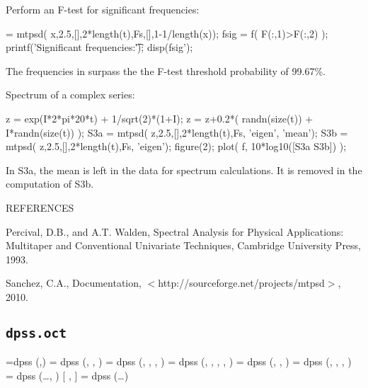 \noindent Perform an F-test for significant frequencies:
\begin{texiexample}
    [S2,f,Sc2,F] = mtpsd( x,2.5,[],2*length(t),Fs,[],1-1/length(x));
    fsig = f( F(:,1)>F(:,2) ); 
    printf('Significant frequencies:\t');
    disp(fsig');
\end{texiexample}
The frequencies in  surpass the the F-test threshold probability of 99.67\%.
\medskip

\noindent Spectrum of a complex series:
\begin{texiexample}
    z = exp(I*2*pi*20*t) + 1/sqrt(2)*(1+I);
    z = z+0.2*( randn(size(t)) + I*randn(size(t)) );
    S3a = mtpsd( z,2.5,[],2*length(t),Fs, 'eigen', 'mean');
    S3b = mtpsd( z,2.5,[],2*length(t),Fs, 'eigen');
    figure(2);
    plot( f, 10*log10([S3a S3b]) ); 
\end{texiexample}
In S3a, the mean is left in the data for spectrum calculations.  It is removed in the computation of S3b.
\bigskip

\noindent REFERENCES
\medskip

\noindent [1] Percival, D.B., and A.T. Walden, Spectral Analysis for Physical Applications: Multitaper and Conventional Univariate Techniques, Cambridge University Press, 1993.
\smallskip

\noindent [2] Sanchez, C.A.,  Documentation, $<$http://sourceforge.net/projects/mtpsd$>$, 2010.

\subsection{\texttt{dpss.oct}}

 { =}{dpss (,)}
 { =} {dpss (, , )}
 { =} {dpss (, , , )}
 { =} {dpss (, , , , )}
 { =} {dpss (, , )}
 { =} {dpss (, , , )}
 { =} {dpss (\dots{}, )}
 {[ ,  ] =} {dpss (\dots{})}
\vspace*{-0.5em}

